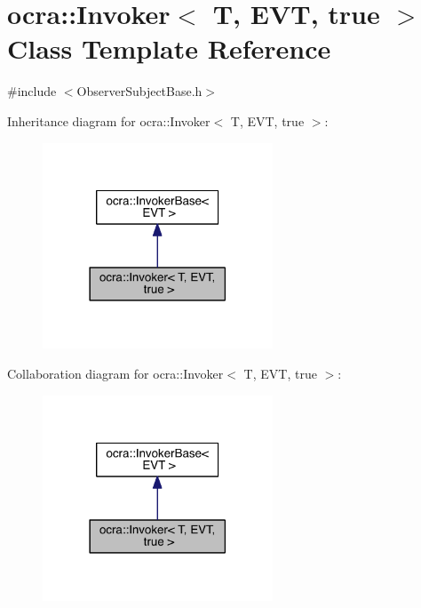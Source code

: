 \hypertarget{classocra_1_1Invoker_3_01T_00_01EVT_00_01true_01_4}{}\section{ocra\+:\+:Invoker$<$ T, E\+VT, true $>$ Class Template Reference}
\label{classocra_1_1Invoker_3_01T_00_01EVT_00_01true_01_4}


{\ttfamily \#include $<$Observer\+Subject\+Base.\+h$>$}



Inheritance diagram for ocra\+:\+:Invoker$<$ T, E\+VT, true $>$\+:\nopagebreak
\begin{figure}[H]
\begin{center}
\leavevmode
\includegraphics[width=194pt]{d6/d68/classocra_1_1Invoker_3_01T_00_01EVT_00_01true_01_4__inherit__graph}
\end{center}
\end{figure}


Collaboration diagram for ocra\+:\+:Invoker$<$ T, E\+VT, true $>$\+:\nopagebreak
\begin{figure}[H]
\begin{center}
\leavevmode
\includegraphics[width=194pt]{d5/dd3/classocra_1_1Invoker_3_01T_00_01EVT_00_01true_01_4__coll__graph}
\end{center}
\end{figure}
